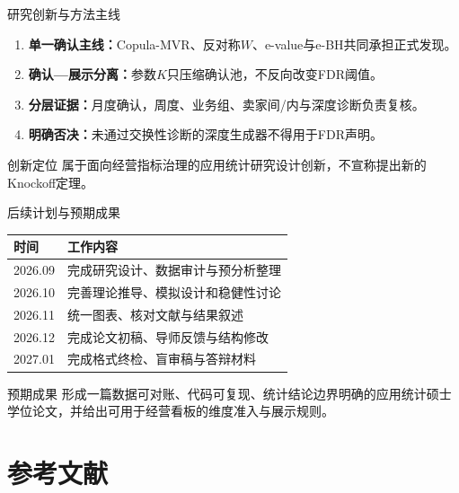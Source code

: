 \documentclass[aspectratio=169]{beamer}
\begin{document}
\begin{frame}{研究创新与方法主线}
  \begin{enumerate}
    \item \textbf{单一确认主线：}Copula-MVR、反对称$W$、e-value与e-BH共同承担正式发现。
    \item \textbf{确认—展示分离：}参数$K$只压缩确认池，不反向改变FDR阈值。
    \item \textbf{分层证据：}月度确认，周度、业务组、卖家间/内与深度诊断负责复核。
    \item \textbf{明确否决：}未通过交换性诊断的深度生成器不得用于FDR声明。
  \end{enumerate}
  \begin{block}{创新定位}
    属于面向经营指标治理的应用统计研究设计创新，不宣称提出新的Knockoff定理。
  \end{block}
\end{frame}

\begin{frame}{后续计划与预期成果}
  \begin{table}
    \centering
    \small
    \begin{tabular}{lp{}}
      \toprule
      时间 & 工作内容 \\
      \midrule
      2026.09 & 完成研究设计、数据审计与预分析整理 \\
      2026.10 & 完善理论推导、模拟设计和稳健性讨论 \\
      2026.11 & 统一图表、核对文献与结果叙述 \\
      2026.12 & 完成论文初稿、导师反馈与结构修改 \\
      2027.01 & 完成格式终检、盲审稿与答辩材料 \\
      \bottomrule
    \end{tabular}
  \end{table}
  \begin{block}{预期成果}
    形成一篇数据可对账、代码可复现、统计结论边界明确的应用统计硕士学位论文，并给出可用于经营看板的维度准入与展示规则。
  \end{block}
\end{frame}

\section{参考文献}
\end{document}
